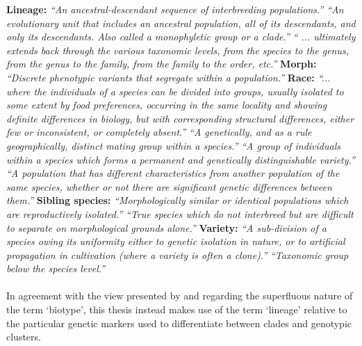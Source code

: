 \textbf{Lineage:} \textit{``An ancestral-descendant sequence of interbreeding populations.''} \citep{simpson1951species} \newline 
\textit{``An evolutionary unit that includes an ancestral population, all of its descendants, and only its descendants. Also called a monophyletic group or a clade.''} \citep{biologicalScienceScott} \newline 
\textit{`` ... ultimately extends back through the various taxonomic levels, from the species to the genus, from the genus to the family, from the family to the order, etc.''} \citep{allaby1992concise} \newline \newline
\textbf{Morph:} \textit{``Discrete phenotypic variants that segregate within a population.''} \citep{mayr1970populations} \newline \newline 
\textbf{Race:} \textit{``... where the individuals of a species can be divided into groups, usually isolated to some extent by food preferences, occurring in the same locality and showing definite differences in biology, but with corresponding structural differences, either few or inconsistent, or completely absent.''} \citep{thorpe1930biological} \newline 
\textit{``A genetically, and as a rule geographically, distinct mating group within a species.''} \citep{darlington1950elements} \newline 
\textit{``A group of individuals within a species which forms a permanent and genetically distinguishable variety.''} \citep{hendersonDictionary} \newline
\textit{``A population that has different characteristics from another population of the same species, whether or not there are significant genetic differences between them.''} \citep{biologicalScienceScott} \newline \newline 
\textbf{Sibling species:} \textit{``Morphologically similar or identical populations which are reproductively isolated.''} \citep{mayr1963} \newline 
\textit{``True species which do not interbreed but are difficult to separate on morphological grounds alone.''} \citep{hendersonDictionary} \newline \newline
\textbf{Variety:} \textit{``A sub-division of a species owing its uniformity either to genetic isolation in nature, or to artificial propagation in cultivation (where a variety is often a clone).''} \citep{darlington1950elements} \newline
\textit{``Taxonomic group below the species level.''} \citep{hendersonDictionary} \\ \\
In agreement with the view presented by \citet{Diehl1984AnBiotypes} and \citet{Downie2010} regarding the superfluous nature of the term `biotype', this thesis instead makes use of the term `lineage' relative to the particular genetic markers used to differentiate between clades and genotypic clusters. 

